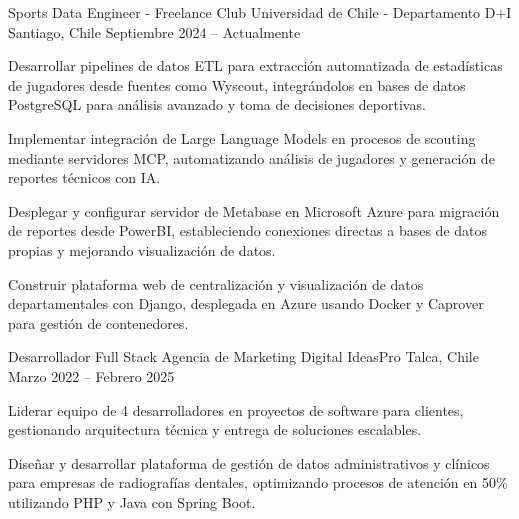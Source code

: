 \documentclass[]{awesome-cv}
\begin{document}
\begin{cventries}
	\cventry
	{Sports Data Engineer - Freelance}
	{Club Universidad de Chile - Departamento D+I}
	{Santiago, Chile}
	{Septiembre 2024 – Actualmente}
	{\begin{cvitems}
		\vspace{0.5mm}
		\item {Desarrollar pipelines de datos ETL para extracción automatizada de estadísticas de jugadores desde fuentes como Wyscout, integrándolos en bases de datos PostgreSQL para análisis avanzado y toma de decisiones deportivas.}
		\item {Implementar integración de Large Language Models en procesos de scouting mediante servidores MCP, automatizando análisis de jugadores y generación de reportes técnicos con IA.}
		\item {Desplegar y configurar servidor de Metabase en Microsoft Azure para migración de reportes desde PowerBI, estableciendo conexiones directas a bases de datos propias y mejorando visualización de datos.}
		\item {Construir plataforma web de centralización y visualización de datos departamentales con Django, desplegada en Azure usando Docker y Caprover para gestión de contenedores.}
		\end{cvitems}}

	\cventry
	{Desarrollador Full Stack}
	{Agencia de Marketing Digital IdeasPro}
	{Talca, Chile}
	{Marzo 2022 – Febrero 2025}
	{\begin{cvitems}
		\vspace{0.5mm}
		\item {Liderar equipo de 4 desarrolladores en proyectos de software para clientes, gestionando arquitectura técnica y entrega de soluciones escalables.}
		\item {Diseñar y desarrollar plataforma de gestión de datos administrativos y clínicos para empresas de radiografías dentales, optimizando procesos de atención en 50\% utilizando PHP y Java con Spring Boot.}
		\end{cvitems}}

\end{cventries}
\end{document}
